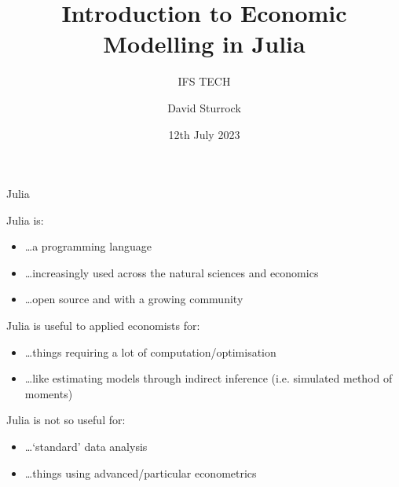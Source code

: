 \documentclass[aspectratio=169]{beamer}
\title{Introduction to Economic Modelling in Julia}
\subtitle{IFS TECH}
\author{David Sturrock}
\date{12th July 2023}
\begin{document}
\begin{frame}
  \titlepage
\end{frame}


\begin{frame}{Julia}

Julia is:
\begin{itemize}
	\item \dots a programming language
	\item \dots increasingly used across the natural sciences and economics
	\item \dots open source and with a growing community
\end{itemize}
\pause

\vspace{0.5cm}
Julia is useful to applied economists for:
\begin{itemize}
	\item \dots things requiring a lot of computation/optimisation
	\item \dots like estimating models through indirect inference (i.e. simulated method of moments)
\end{itemize}
\pause

\vspace{0.5cm}
Julia is not so useful for:
\begin{itemize}
	\item \dots `standard' data analysis
	\item \dots things using advanced/particular econometrics
\end{itemize}


\end{frame}
\end{document}
